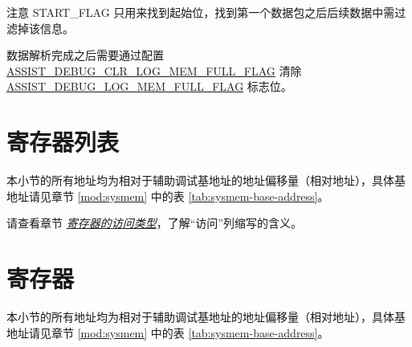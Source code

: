 \documentclass[main\_\_CN.tex]{subfiles}
\begin{document}
注意 START\_FLAG 只用来找到起始位，找到第一个数据包之后后续数据中需过滤掉该信息。

数据解析完成之后需要通过配置 \hyperref[fielddesc:ASSISTDEBUGCLRLOGMEMFULLFLAG]{ASSIST\_DEBUG\_CLR\_LOG\_MEM\_FULL\_FLAG} 清除 \\ \hyperref[fielddesc:ASSISTDEBUGLOGMEMFULLFLAG]{ASSIST\_DEBUG\_LOG\_MEM\_FULL\_FLAG} 标志位。



\clearpage
\section{寄存器列表}
\label{sec:dbgassist-reg-summ}
\hypertarget{dbgassist-reg-summ}{}

本小节的所有地址均为相对于辅助调试基地址的地址偏移量（相对地址），具体基地址请见章节 \ref{mod:sysmem} \textit{} 中的表 \ref{tab:sysmem-base-address}。

请查看章节 \hyperref[glossary-access-types]{\textit{寄存器的访问类型}}，了解“访问”列缩写的含义。





\clearpage
\section{寄存器}\label{sec:dbgassist-reg}

本小节的所有地址均为相对于辅助调试基地址的地址偏移量（相对地址），具体基地址请见章节 \ref{mod:sysmem} \textit{} 中的表 \ref{tab:sysmem-base-address}。


\end{document}
